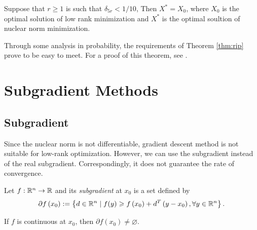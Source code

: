 \documentclass[11pt]{article}
\begin{document}
\begin{theorem}\label{thm:rip}
    Suppose that \(r \geqslant 1\) is such that \(\delta_{5r} < 1/10\), Then \(X^* = X_0\), where \(X_0\) is the optimal solution of low rank minimization and \(X^*\) is the optimal soultion of nuclear norm minimization.
\end{theorem} 

Through some analysis in probability, the requirements of Theorem \ref{thm:rip} prove to be easy to meet. For a proof of this theorem, see \cite{recht2010guaranteed}.

\section{Subgradient Methods}

\subsection{Subgradient}

Since the nuclear norm is not differentiable, gradient descent method is not suitable for low-rank optimization. However, we can use the subgradient instead of the real subgradient. Correspondingly, it does not guarantee the rate of convergence.

\begin{definition}[Subgradient]
    Let \(f:\mathbb R^n \to \mathbb R\) and its \emph{subgradient} at \(x_0\) is a set defined by
    \[\partial f\left(x_0\right) := \left\{d \in \mathbb R^n \mid f(y)\geqslant f\left(x_0\right) + d^T \left(y-x_0\right),\forall y \in \mathbb R^n\right\}.\]
\end{definition}

\begin{remark}
    If \(f\) is continuous at \(x_0\), then \(\partial f(x_0) \neq \varnothing\).
\end{remark}
\end{document}
